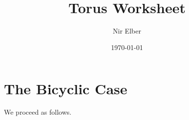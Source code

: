 \documentclass{article}
\title{Torus Worksheet}
\author{Nir Elber}
\date{\today}
\numberwithin{equation}{section}
\begin{document}
\maketitle

\section{The Bicyclic Case}
We proceed as follows.
\end{document}
